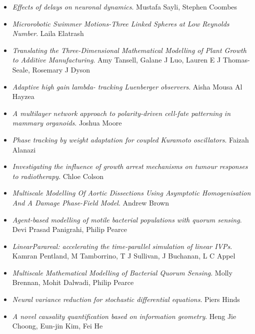\begin{itemize}
\item \textit{Effects of delays on neuronal dynamics}.
Mustafa Sayli, Stephen Coombes

\item \textit{Microrobotic Swimmer Motions-Three Linked Spheres at Low Reynolds Number}.
Laila Elatrash

\item \textit{Translating the Three-Dimensional Mathematical Modelling of Plant Growth to Additive Manufacturing}.
Amy Tansell, Galane J Luo, Lauren E J Thomas-Seale, Rosemary J Dyson

\item \textit{Adaptive high gain lambda- tracking Luenberger observers}.
Aisha Mousa Al Hayzea

\item \textit{A multilayer network approach to polarity-driven cell-fate patterning in mammary organoids}.
Joshua Moore

\item \textit{Phase tracking by weight adaptation for coupled Kuramoto oscillators}.
Faizah Alanazi

\item \textit{Investigating the influence of growth arrest mechanisms on tumour responses to radiotherapy}.
Chloe Colson

\item \textit{Multiscale Modelling Of Aortic Dissections Using Asymptotic Homogenisation And A Damage Phase-Field Model}.
Andrew Brown

\item \textit{Agent-based modelling of motile bacterial populations with quorum sensing}.
Devi Prasad Panigrahi, Philip Pearce

\item \textit{LinearParareal: accelerating the time-parallel simulation of linear IVPs}.
Kamran Pentland, M Tamborrino, T J Sullivan, J Buchanan, L C Appel

\item \textit{Multiscale Mathematical Modelling of Bacterial Quorum Sensing}.
Molly Brennan, Mohit Dalwadi, Philip Pearce

\item \textit{Neural variance reduction for stochastic differential equations}.
Piers Hinds

\item \textit{A novel causality quantification based on information geometry}.
Heng Jie Choong, Eun-jin Kim, Fei He


\end{itemize}
